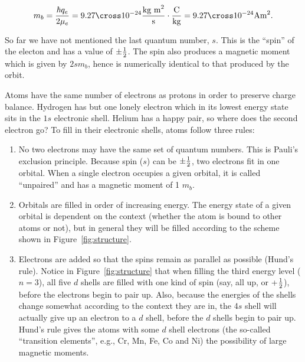 $$
m_b = { \hbar 
{q_e}\over {2\mu_e}
} = 9.27 \cross 10^{-24} 
{{\hbox{kg  m}^2}\over {\hbox{s}}}
 \cdot
 {\hbox{C}\over {\hbox{kg}}}
 = 9.27 \cross 10^{-24} {\hbox{Am}^2}.
$$

So far we have not mentioned the last quantum number, $s$.  This is the 
``spin'' of the electon and has a value of $\pm {1\over 2}$.   The spin also produces a magnetic moment which is given by $2sm_b$, hence is numerically identical to that produced by the orbit.   

Atoms have the same number of electrons as protons in order to preserve charge balance.  Hydrogen has but one lonely electron which in its lowest energy state sits in the $1s$ electronic shell.  Helium has a happy pair, so where does the second electron go?  To fill in their electronic shells, atoms follow three rules:

\begin{enumerate}

\item No two electrons may have the same set of quantum numbers.  This is 
Pauli's exclusion principle.  Because spin ($s$) can be $\pm {1\over 2}$, two  electrons fit in one orbital.    When a single electron occupies a given orbital, it is called ``unpaired'' and has a magnetic moment of 1 $m_b$.  

\item Orbitals are filled in order of increasing energy.  The energy state of a given orbital is dependent on the context (whether the atom is bound to other atoms or not), but in general they will be filled according to the scheme shown in Figure~\ref{fig:structure}.  

\item Electrons are added so that the  spins remain as parallel as possible 
(Hund's rule).   Notice in  Figure~\ref{fig:structure} that when filling the third energy level ($n=3$), all five $d$ shells  are filled with one kind of spin (say, all up, or +$1\over 2$), before the electrons begin to pair up.  Also, because the energies of the shells change somewhat according to the context they are in, the 4$s$ shell will actually give up an electron to a $d$ shell, before the $d$ shells begin to pair up.    Hund's rule gives the atoms with some $d$ shell electrons (the so-called ``transition elements'', e.g.,  Cr, Mn, Fe, Co and Ni)  the possibility of large magnetic moments.    

\end{enumerate}

